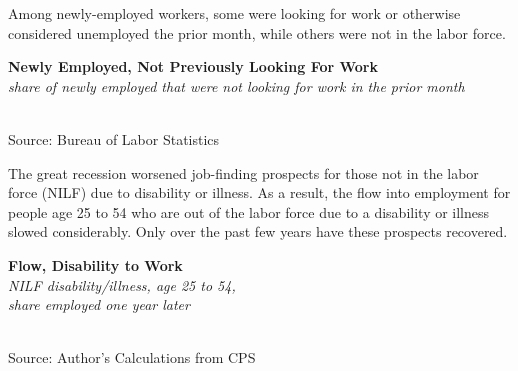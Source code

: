 \documentclass{report}
\makeatletter
\newcommand{\tbllink}[1]{\href{https://raw.githubusercontent.com/bdecon/US-chartbook/master/chartbook/data/#1}{\faTable}}
\newcommand*\short[1]{\expandafter\@gobbletwo\number\numexpr#1\relax}
\newcommand{\dateaxisticks}{
		date coordinates in=x, axis line style={draw=none},
		xmax={2021-06-15},
		max space between ticks=40,	    
		xtick={{1990-01-01}, {1992-01-01}, {1994-01-01}, 
			{1996-01-01}, {1998-01-01}, {2000-01-01}, 
			{2002-01-01}, {2004-01-01}, {2006-01-01},
			{2008-01-01}, {2010-01-01}, {2012-01-01}, {2014-01-01},
		    {2016-01-01}, {2018-01-01}, {2020-01-01}},
		minor xtick={{1989-01-01}, {1991-01-01}, {1993-01-01},
			{1995-01-01}, {1997-01-01}, {1999-01-01}, 
			{2001-01-01}, {2003-01-01}, {2005-01-01}, {2007-01-01},
		    {2009-01-01}, {2011-01-01}, {2013-01-01}, {2015-01-01},
		    {2017-01-01}, {2019-01-01}, {2021-01-01}},
		enlarge y limits={0.06}, enlarge x limits={0.01},
		}
\newcommand{\shdateaxisticks}{
		date coordinates in=x, axis line style={draw=none},
		xmax={2021-06-15},
		max space between ticks=40,	    
		xtick={{1990-01-01}, {1995-01-01}, {2000-01-01}, 
			{2005-01-01}, {2010-01-01}, {2015-01-01}, {2020-01-01}},
		minor xtick={},
		enlarge y limits={0.06}, enlarge x limits={0.01},
		}
\newcommand{\bbar}[2]{extra #1 ticks = {{#2}}, extra #1 tick labels = ,
		extra #1 tick style = {grid=major, grid style={thick, black!25}},}
\newcommand{\stdline}[4]{\addplot[very thick, no markers, color=#1] 
		table [x=#2, y=#3, col sep=comma] {#4};	}
\newcommand{\rbars}{
		\fill[color=black!10] (axis cs:{1990-07-01},\pgfkeysvalueof{/pgfplots/ymin}) rectangle 
			(axis cs:{1991-03-01}, \pgfkeysvalueof{/pgfplots/ymax});
		\fill[color=black!10] (axis cs:{2007-12-01},\pgfkeysvalueof{/pgfplots/ymin}) rectangle 
			(axis cs:{2009-07-01}, \pgfkeysvalueof{/pgfplots/ymax});
		\fill[color=black!10] (axis cs:{2001-03-01},\pgfkeysvalueof{/pgfplots/ymin}) rectangle 
			(axis cs:{2001-11-01}, \pgfkeysvalueof{/pgfplots/ymax});
		\fill[color=black!10] (axis cs:{2020-02-01},\pgfkeysvalueof{/pgfplots/ymin}) rectangle 
			(axis cs:{2021-06-15}, \pgfkeysvalueof{/pgfplots/ymax});}
\newcommand{\rebars}{
		\fill[color=black!10] (axis cs:{2007-12-01},\pgfkeysvalueof{/pgfplots/ymin}) rectangle 
			(axis cs:{2009-07-01}, \pgfkeysvalueof{/pgfplots/ymax});
		\fill[color=black!10] (axis cs:{2001-03-01},\pgfkeysvalueof{/pgfplots/ymin}) rectangle 
			(axis cs:{2001-11-01}, \pgfkeysvalueof{/pgfplots/ymax});
		\fill[color=black!10] (axis cs:{2020-02-01},\pgfkeysvalueof{/pgfplots/ymin}) rectangle 
			(axis cs:{2021-06-15}, \pgfkeysvalueof{/pgfplots/ymax});}
\makeatother
\begin{document}
{{\begin{minipage}{0.76\textwidth}
Among newly-employed workers, some were looking for work or otherwise considered unemployed the prior month, while others were not in the labor force.  
\vspace{2mm}

\normalsize \textbf{Newly Employed, Not Previously Looking For Work}\\
\footnotesize{\textit{share of newly employed that were not looking for work in the prior month}}\\
\hspace*{-2mm} \\
\footnotesize{Source: Bureau of Labor Statistics} \hfill \tbllink{lf_flow.csv} \ \tbllink{lf_flow_q.csv}
\end{minipage}
\vspace{3mm}

\begin{minipage}{0.32\textwidth}
\small The great recession worsened job-finding prospects for those not in the labor force (NILF) due to disability or illness. As a result, the flow into employment for people age 25 to 54 who are out of the labor force due to a disability or illness slowed considerably. Only over the past few years have these prospects recovered. 
\end{minipage} \hspace{5mm} \begin{minipage}{0.4\textwidth}
\normalsize \textbf{Flow, Disability to Work}\\
\footnotesize{\textit{NILF disability/illness, age 25 to 54,}}\\
\footnotesize{\textit{share employed one year later}}\\
\hspace*{-2mm} \\
\footnotesize{Source: Author's Calculations from CPS} \hfill \tbllink{disflow.csv}
\end{minipage}
\newpage
\begin{minipage}{0.76\textwidth}

\end{minipage}}}
\end{document}
